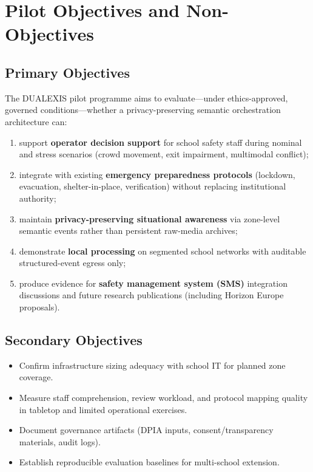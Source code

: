\section{Pilot Objectives and Non-Objectives}
\label{sec:objectives}

\subsection{Primary Objectives}

The DUALEXIS pilot programme aims to evaluate---under ethics-approved, governed
conditions---whether a privacy-preserving semantic orchestration architecture can:

\begin{enumerate}
  \item support \textbf{operator decision support} for school safety staff during nominal
        and stress scenarios (crowd movement, exit impairment, multimodal conflict);
  \item integrate with existing \textbf{emergency preparedness protocols} (lockdown,
        evacuation, shelter-in-place, verification) without replacing institutional authority;
  \item maintain \textbf{privacy-preserving situational awareness} via zone-level semantic
        events rather than persistent raw-media archives;
  \item demonstrate \textbf{local processing} on segmented school networks with auditable
        structured-event egress only;
  \item produce evidence for \textbf{safety management system (SMS)} integration discussions
        and future research publications (including Horizon Europe proposals).
\end{enumerate}

\subsection{Secondary Objectives}

\begin{itemize}[noitemsep]
  \item Confirm infrastructure sizing adequacy with school IT for planned zone coverage.
  \item Measure staff comprehension, review workload, and protocol mapping quality in
        tabletop and limited operational exercises.
  \item Document governance artifacts (DPIA inputs, consent/transparency materials, audit logs).
  \item Establish reproducible evaluation baselines for multi-school extension.
\end{itemize}

